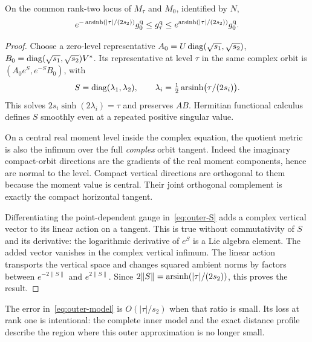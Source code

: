 \begin{lemma}\label{lem:outer-model}
On the common rank-two locus of $M_\tau$ and $M_0$, identified by $N$,
\begin{equation}\label{eq:outer-model}
e^{-\operatorname{arsinh}(|\tau|/(2s_2))}g_0^{\rm q}
\le g_\tau^{\rm q}\le
e^{\operatorname{arsinh}(|\tau|/(2s_2))}g_0^{\rm q}.
\end{equation}
\end{lemma}

\begin{proof}
Choose a zero-level representative
$A_0=U\operatorname{diag}(\sqrt{s_1},\sqrt{s_2})$,
$B_0=\operatorname{diag}(\sqrt{s_1},\sqrt{s_2})V^*$.
Its representative at level $\tau$ in the same complex orbit is
$(A_0e^S,e^{-S}B_0)$, with
\begin{equation}\label{eq:outer-S}
S=\operatorname{diag}(\lambda_1,\lambda_2),\qquad
\lambda_i=\tfrac12\operatorname{arsinh}\bigl(\tau/(2s_i)\bigr).
\end{equation}
This solves $2s_i\sinh(2\lambda_i)=\tau$ and preserves $AB$.
Hermitian functional calculus defines $S$ smoothly even at a repeated
positive singular value.

On a central real moment level inside the complex equation, the quotient
metric is also the infimum over the full \emph{complex} orbit tangent.
Indeed the imaginary compact-orbit directions are the gradients of
the real moment components, hence are normal to the level.
Compact vertical directions are orthogonal to them because the moment
value is central. Their joint orthogonal complement is exactly the
compact horizontal tangent.

Differentiating the point-dependent gauge in~\eqref{eq:outer-S}
adds a complex vertical vector to its linear action on a tangent.
This is true without commutativity of $S$ and its derivative: the
logarithmic derivative of $e^S$ is a Lie algebra element. The added
vector vanishes in the complex vertical infimum. The linear action
transports the vertical space and changes squared ambient norms by
factors between $e^{-2\|S\|}$ and $e^{2\|S\|}$. Since
$2\|S\|=\operatorname{arsinh}(|\tau|/(2s_2))$, this proves the result.
\end{proof}

The error in~\eqref{eq:outer-model} is $O(|\tau|/s_2)$ when that ratio
is small. Its loss at rank one is intentional: the complete inner
model and the exact distance profile describe the region where this
outer approximation is no longer small.

